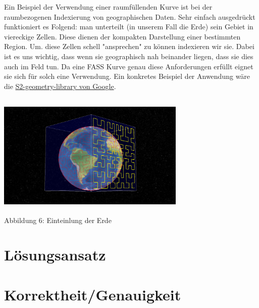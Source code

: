 \documentclass[course=erap]{aspdoc}
\begin{document}
\newpage %
Ein Beispiel der Verwendung einer raumfüllenden Kurve ist bei der raumbezogenen Indexierung von geographischen Daten. Sehr einfach ausgedrückt funktioniert es Folgend: man unterteilt (in unserem Fall die Erde) sein Gebiet in viereckige Zellen. Diese dienen der kompakten Darstellung einer bestimmten Region. Um. diese Zellen schell "ansprechen" zu können indexieren wir sie. Dabei ist es uns wichtig, dass wenn sie geographisch nah beinander liegen, dass  sie dies auch im Feld tun. Da eine FASS Kurve genau diese Anforderungen erfüllt eignet sie sich für solch eine Verwendung. Ein konkretes Beispiel der Anwendung wäre die \href{https://code.google.com/archive/p/s2-geometry-library/}{S2-geometry-library von Google}. 
\\
\begin{center}
	\includegraphics[width=9cm, height=6cm]{Earth}\\	%
	\tiny Abbildung 6: Einteinlung der Erde %
\end{center}


\section{Lösungsansatz}


\section{Korrektheit/Genauigkeit}
\end{document}
